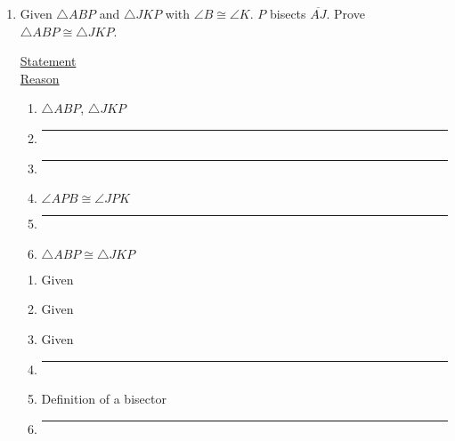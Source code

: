\begin{enumerate}
  
\newpage
\item Given $\triangle ABP$ and $\triangle JKP$ with $\angle B \cong \angle K$. $P$ bisects $\overline{AJ}$. Prove $\triangle ABP \cong \triangle JKP$.\\[0.5cm]
  \begin{multicols}{2}
    \underline{Statement} \\
    \underline{Reason}
  \end{multicols}
  \begin{multicols}{2}
  \raggedcolumns
  \begin{enumerate}[label={\arabic*)}]
    \item $\triangle ABP$, $\triangle JKP$ \vspace{0.3cm}
    \item \rule{4cm}{0.15mm} \vspace{0.3cm}
    \item \rule{4cm}{0.15mm} \vspace{0.3cm}
    \item $\angle APB \cong \angle JPK$  \vspace{0.3cm}
    \item \rule{4cm}{0.15mm} \vspace{0.3cm}
    \item $\triangle ABP \cong \triangle JKP$ \vspace{0.3cm}
  \end{enumerate}
  \begin{enumerate}[label={\arabic*)}]
    \item Given \vspace{0.3cm}
    \item Given \vspace{0.3cm}
    \item Given \vspace{0.3cm}
    \item \rule{4cm}{0.15mm} \vspace{0.3cm}
    \item Definition of a bisector \vspace{0.3cm}
    \item \rule{4cm}{0.15mm} \vspace{0.3cm}
  \end{enumerate}
  \end{multicols}


\end{enumerate}
